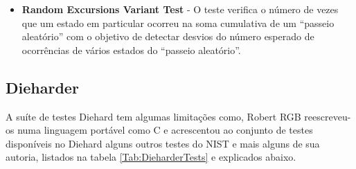 \begin{itemize}
   \item \textbf{Random Excursions Variant Test} - O teste verifica o número de vezes que um estado em particular ocorreu na soma cumulativa de um ``passeio aleatório'' com o objetivo de detectar desvios do número esperado de ocorrências de vários estados do ``passeio aleatório''.
  \end{itemize}

  \subsection{Dieharder}
  A suíte de testes Diehard tem algumas limitações como, Robert RGB reescreveu-os numa linguagem portável como C e acrescentou ao conjunto de testes disponíveis no Diehard alguns outros testes do NIST e mais alguns de sua autoria, listados na tabela \ref{Tab:DieharderTests} e explicados abaixo.
